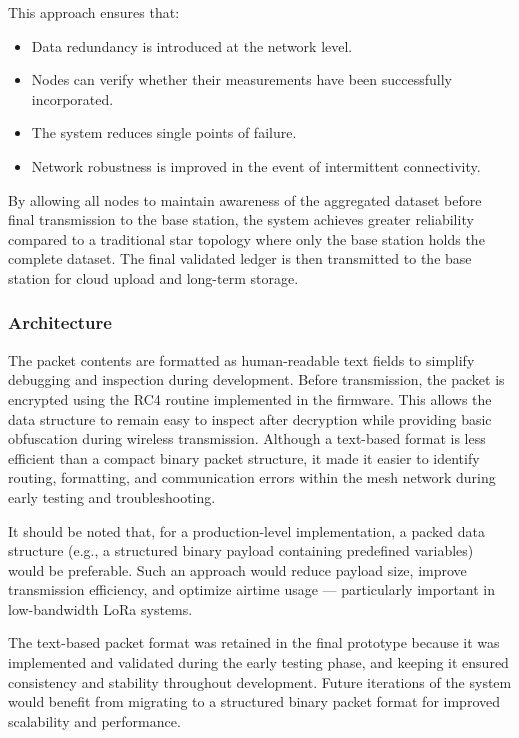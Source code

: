 This approach ensures that:

\begin{itemize}
\item
  Data redundancy is introduced at the network level.
\item
  Nodes can verify whether their measurements have been successfully
  incorporated.
\item
  The system reduces single points of failure.
\item
  Network robustness is improved in the event of intermittent
  connectivity.
\end{itemize}

By allowing all nodes to maintain awareness of the aggregated dataset
before final transmission to the base station, the system achieves
greater reliability compared to a traditional star topology where only
the base station holds the complete dataset. The final validated ledger
is then transmitted to the base station for cloud upload and long-term
storage.

\subsubsection{Architecture}

The packet contents are formatted as human-readable text fields to simplify debugging and inspection during development. Before transmission, the packet is encrypted using the RC4 routine implemented in the firmware. This allows the data structure to remain easy to inspect after decryption while providing basic obfuscation during wireless transmission. Although a text-based format is less efficient than a compact binary packet structure, it made it easier to identify routing, formatting, and communication errors within the mesh network during early testing and troubleshooting.

It should be noted that, for a production-level implementation, a packed
data structure (e.g., a structured binary payload containing predefined
variables) would be preferable. Such an approach would reduce payload
size, improve transmission efficiency, and optimize airtime usage ---
particularly important in low-bandwidth LoRa systems.

The text-based packet format was retained in the final prototype because it was implemented and validated during the early testing phase, and keeping it ensured consistency and stability throughout development. Future iterations of the system would benefit from migrating to a structured binary packet format for improved scalability and performance.


